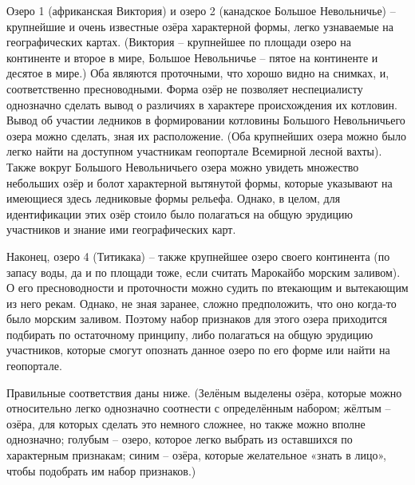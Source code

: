 Озеро 1 (африканская Виктория) и озеро 2 (канадское Большое Невольничье) – крупнейшие и очень известные озёра характерной формы, легко узнаваемые на географических картах. (Виктория – крупнейшее по площади озеро на континенте и второе в мире, Большое Невольничье – пятое на континенте и десятое в мире.) Оба являются проточными, что хорошо видно на снимках, и, соответственно пресноводными. Форма озёр не позволяет неспециалисту однозначно сделать вывод о различиях в характере происхождения их котловин. Вывод об участии ледников в формировании котловины Большого Невольничьего озера можно сделать, зная их расположение. (Оба крупнейших озера можно было легко найти на доступном участникам геопортале Всемирной лесной вахты). Также вокруг Большого Невольничьего озера можно увидеть множество небольших озёр и болот характерной вытянутой формы, которые указывают на имеющиеся здесь ледниковые формы рельефа. Однако, в целом, для идентификации этих озёр стоило было полагаться на общую эрудицию участников и знание ими географических карт.

Наконец, озеро 4 (Титикака) – также крупнейшее озеро своего континента (по запасу воды, да и по площади тоже, если считать Марокайбо морским заливом). О его пресноводности и проточности можно судить по втекающим и вытекающим из него рекам. Однако, не зная заранее, сложно предположить, что оно когда-то было морским заливом. Поэтому набор признаков для этого озера приходится подбирать по остаточному принципу, либо полагаться на общую эрудицию участников, которые смогут опознать данное озеро по его форме или найти на геопортале.

Правильные соответствия даны ниже. (Зелёным выделены озёра, которые можно относительно легко однозначно соотнести с определённым набором; жёлтым – озёра, для которых сделать это немного сложнее, но также можно вполне однозначно;  голубым – озеро, которое легко выбрать из оставшихся по характерным признакам; синим – озёра, которые желательное «знать в лицо», чтобы подобрать им набор признаков.)

